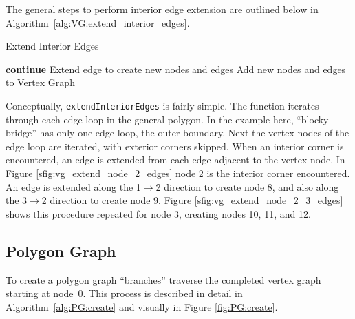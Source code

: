 The general steps to perform interior edge extension are outlined below in Algorithm~\ref{alg:VG:extend_interior_edges}.

\begin{algorithm}[htb]
\caption{Extend Interior Edges}\label{alg:VG:extend_interior_edges}
\begin{algorithmic}[1]
				\State \textbf{continue}
			\EndIf
				\State Extend edge to create new nodes and edges
				\State Add new nodes and edges to Vertex Graph
			\EndFor
		\EndFor
	\EndFor
\EndFunction
\end{algorithmic}
\end{algorithm}

Conceptually, \verb|extendInteriorEdges| is fairly simple.
The function iterates through each edge loop in the general polygon.
In the example here, ``blocky bridge'' has only one edge loop, the outer boundary.
Next the vertex nodes of the edge loop are iterated, with exterior corners skipped.
When an interior corner is encountered, an edge is extended from each edge adjacent to the vertex node.
In Figure \ref{sfig:vg_extend_node_2_edges} node 2 is the interior corner encountered.
An edge is extended along the 1$\rightarrow$2 direction to create node 8, and also along the 3$\rightarrow$2 direction to create node 9.
Figure \ref{sfig:vg_extend_node_2_3_edges} shows this procedure repeated for node 3, creating nodes 10, 11, and 12.

\subsection{Polygon Graph}
To create a polygon graph ``branches'' traverse the completed vertex graph starting at node~0.
This process is described in detail in Algorithm~\ref{alg:PG:create} and visually in Figure \ref{fig:PG:create}.

